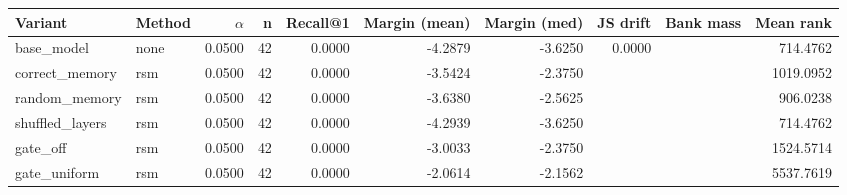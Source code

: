 \begin{tabular}{l l r r r r r r r r}
\toprule
Variant & Method & $\alpha$ & n & Recall@1 & Margin (mean) & Margin (med) & JS drift & Bank mass & Mean rank \\
\midrule
base\_model & none & 0.0500 & 42 & 0.0000 & -4.2879 & -3.6250 & 0.0000 &  & 714.4762 \\
correct\_memory & rsm & 0.0500 & 42 & 0.0000 & -3.5424 & -2.3750 &  &  & 1019.0952 \\
random\_memory & rsm & 0.0500 & 42 & 0.0000 & -3.6380 & -2.5625 &  &  & 906.0238 \\
shuffled\_layers & rsm & 0.0500 & 42 & 0.0000 & -4.2939 & -3.6250 &  &  & 714.4762 \\
gate\_off & rsm & 0.0500 & 42 & 0.0000 & -3.0033 & -2.3750 &  &  & 1524.5714 \\
gate\_uniform & rsm & 0.0500 & 42 & 0.0000 & -2.0614 & -2.1562 &  &  & 5537.7619 \\
\bottomrule
\end{tabular}
